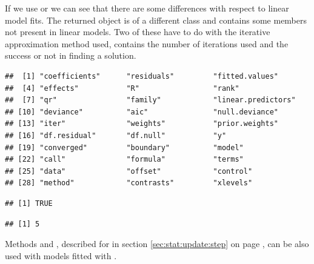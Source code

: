 \documentclass[krantz2]{krantz}\usepackage{knitr}
\begin{document}
\begin{explainbox}
If we use  or  we can see that there are some differences with respect to linear model fits. The returned object is of a different class and contains some members not present in linear models. Two of these have to do with the iterative approximation method used,  contains the number of iterations used  and  the success or not in finding a solution.

\begin{knitrout}\footnotesize
{}\color{fgcolor}\begin{kframe}
\begin{alltt}
\end{alltt}
\begin{verbatim}
##  [1] "coefficients"      "residuals"         "fitted.values"    
##  [4] "effects"           "R"                 "rank"             
##  [7] "qr"                "family"            "linear.predictors"
## [10] "deviance"          "aic"               "null.deviance"    
## [13] "iter"              "weights"           "prior.weights"    
## [16] "df.residual"       "df.null"           "y"                
## [19] "converged"         "boundary"          "model"            
## [22] "call"              "formula"           "terms"            
## [25] "data"              "offset"            "control"          
## [28] "method"            "contrasts"         "xlevels"
\end{verbatim}
\begin{alltt}
\hlopt{$}
\end{alltt}
\begin{verbatim}
## [1] TRUE
\end{verbatim}
\begin{alltt}
\hlopt{$}
\end{alltt}
\begin{verbatim}
## [1] 5
\end{verbatim}
\end{kframe}
\end{knitrout}
\end{explainbox}

Methods  and , described for  in section \ref{sec:stat:update:step} on page \pageref{sec:stat:update:step}, can be also used with models fitted with .

\end{document}
